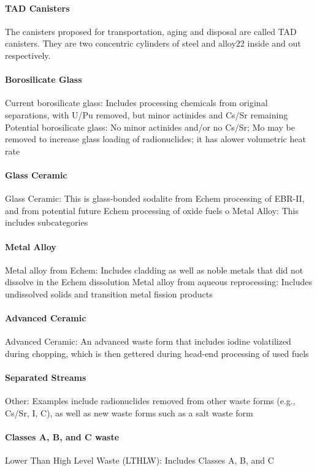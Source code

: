 \paragraph{TAD Canisters} The canisters proposed for transportation, aging and 
disposal are called TAD canisters.  They are two concentric cylinders of steel 
and alloy22 inside and out respectively. 


\paragraph{Borosilicate Glass} Current borosilicate glass: Includes processing 
chemicals from original separations, with U/Pu removed, but minor actinides and 
Cs/Sr remaining Potential borosilicate glass: No minor actinides and/or no 
Cs/Sr; Mo may be removed to increase glass loading of radionuclides; it has 
alower volumetric heat rate


\paragraph{Glass Ceramic} Glass Ceramic:  This is glass-bonded sodalite from 
Echem processing of EBR-II, and from potential future Echem processing of oxide 
fuels o Metal Alloy: This includes subcategories


\paragraph{Metal Alloy} Metal alloy from Echem: Includes cladding as well as 
noble metals that did not dissolve in the Echem dissolution Metal alloy from 
aqueous reprocessing:  Includes undissolved solids and transition metal fission 
products


\paragraph{Advanced Ceramic} Advanced Ceramic: An advanced waste form that 
includes iodine volatilized during chopping, which is then gettered during 
head-end processing of used fuels


\paragraph{Separated Streams} Other:  Examples include radionuclides removed 
from other waste forms (e.g., Cs/Sr, I, C), as well as new waste forms such as a 
salt waste form

\paragraph{Classes A, B, and C waste} Lower Than High Level Waste (LTHLW): 
Includes Classes A, B, and C

